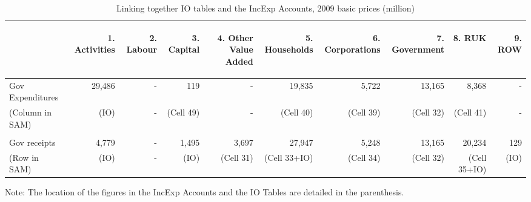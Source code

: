   \begin{table}[H] \caption{Linking together IO tables and the IncExp Accounts, 2009 basic prices (\textsterling million)}
  \bigskip \begin{scriptsize} \begin{centering} \begin{doublespacing}
  \begin{tabular}{lrrrrrrrrr}
  \toprule
  & \begin{sideways}1. Activities \end{sideways} &
  \begin{sideways}2. Labour \end{sideways} &
  \begin{sideways}3. Capital \end{sideways} &
  \begin{sideways}4. Other Value Added \end{sideways} &
  \begin{sideways}5. Households \end{sideways} &
  \begin{sideways}6. Corporations \end{sideways} &
  \begin{sideways}7. Government \end{sideways} &
  \begin{sideways}8. RUK \end{sideways} &
  \begin{sideways}9. ROW \end{sideways} \bigstrut[b]\\
  \hline
  Gov Expenditures  & 29,486  &  \: \: \: - &  119  & - & 19,835  & 5,722  & 13,165  & 8,368  &  - \\
  (Column in SAM) &  (IO)  &  - &  (Cell 49)  & - &  (Cell 40)  &  (Cell 39)  &  (Cell 32)  &  (Cell 41)  &  - \\
  & & & & & & & & &  \\
  Gov receipts & 4,779  &  - & 1,495  & 3,697  & 27,947  & 5,248  & 13,165  & 20,234  &  129  \\
  (Row in SAM) & (IO) &  - & (IO) & (Cell 31) & (Cell 33+IO) & (Cell 34) & (Cell 32) & (Cell 35+IO) & (IO)
  \bigstrut[t]\\
  \bottomrule \end{tabular}%
  \bigskip \begin{flushright} Note: The location of the figures in the IncExp Accounts and the IO Tables are detailed in the parenthesis.\end{flushright} \label{tab:2.4.2}
  \end{doublespacing} \end{centering} \end{scriptsize} \end{table}

